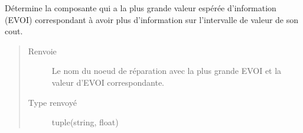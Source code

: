 \documentclass[letterpaper,10pt,french]{sphinxmanual}
\begin{document}
\begin{fulllineitems}
\begin{fulllineitems}
\begin{quote}
\begin{description}
\begin{itemize}
\end{itemize}

\end{description}\end{quote}

\end{fulllineitems}


\begin{fulllineitems}
\label{\detokenize{index:DecisionTheoreticTroubleshooting.TroubleShootingProblem.best_EVOI}}
Détermine la composante qui a la plus grande valeur espérée
d’information (EVOI) correspondant à avoir plus d’information sur
l’intervalle de valeur de son cout.
\begin{quote}\begin{description}
\item[{Renvoie}] \leavevmode
Le nom du noeud de réparation avec la plus grande EVOI et la valeur
d’EVOI correspondante.

\item[{Type renvoyé}] \leavevmode
tuple(string, float)

\end{description}\end{quote}

\end{fulllineitems}



\end{fulllineitems}
\end{document}
